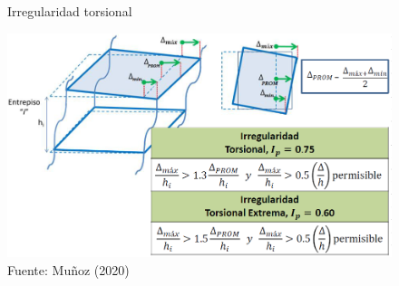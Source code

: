 \documentclass{article}%
\begin{document}
\begin{figure}[H]%
\centering%
\caption{Irregularidad torsional}%
\includegraphics[scale=0.7]{images/i_torsion.PNG}%
\caption*{\small Fuente: Muñoz (2020)}%
\end{figure}

%
\end{document}
